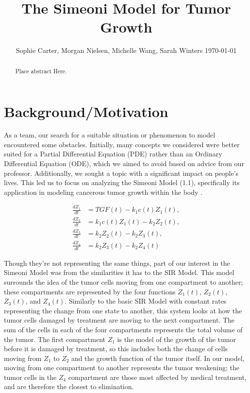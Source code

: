 \documentclass[11pt]{amsart}
\begin{document}
\title{The Simeoni Model for Tumor Growth}
\author{Sophie Carter, Morgan Nielsen, Michelle Wang, Sarah Winters \today}


\maketitle

\begin{abstract}
Place abstract Here.
\end{abstract}

\section{Background/Motivation}
As a team, our search for a suitable situation or phenomenon to model encountered some obstacles. Initially, many concepts we considered were better suited for a Partial Differential Equation (PDE) rather than an Ordinary Differential Equation (ODE), which we aimed to avoid based on advice from our professor. Additionally, we sought a topic with a significant impact on people's lives. This led us to focus on analyzing the Simeoni Model (1.1), specifically its application in modeling cancerous tumor growth within the body \cite{Koziol_Falls_Schnitzer_2020}.

\begin{equation}
\begin{aligned}
    \frac{dZ_1}{dt} &= TGF(t) - k_1c(t)Z_1(t), \\
    \frac{dZ_2}{dt} &= k_1c(t)Z_1(t) - k_2Z_2(t), \\ 
    \frac{dZ_3}{dt} &= k_2Z_2(t) - k_2Z_3(t), \\
    \frac{dZ_4}{dt} &= k_2Z_3(t) - k_2Z_4(t)
\end{aligned}
\tag*{(1.1)}
\end{equation}
\hspace{2em}
 
Though they're not representing the same things, part of our interest in the Simeoni Model was from the similarities it has to the SIR Model. This model surrounds the idea of the tumor cells moving from one compartment to another; these compartments are represented by the four functions $Z_1(t)$, $Z_2(t)$, $Z_3(t)$, and $Z_4(t)$. Similarly to the basic SIR Model with constant rates representing the change from one state to another, this system looks at how the tumor cells damaged by treatment are moving to the next compartment. The sum of the cells in each of the four compartments represents the total volume of the tumor. The first compartment $Z_1$ is the model of the growth of the tumor before it is damaged by treatment, so this includes both the change of cells moving from $Z_1$ to $Z_2$ and the growth function of the tumor itself. In our model, moving from one compartment to another represents the tumor weakening; the tumor cells in the $Z_4$ compartment are those most affected by medical treatment, and are therefore the closest to elimination. 
\end{document}
